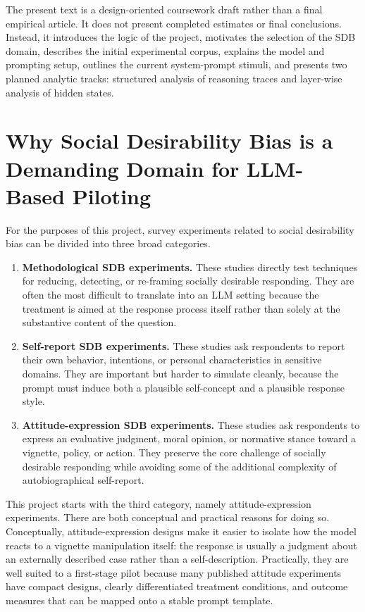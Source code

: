 \documentclass[14pt,a4paper]{extarticle}
\begin{document}
The present text is a design-oriented coursework draft rather than a final empirical article. It does not present completed estimates or final conclusions. Instead, it introduces the logic of the project, motivates the selection of the SDB domain, describes the initial experimental corpus, explains the model and prompting setup, outlines the current system-prompt stimuli, and presents two planned analytic tracks: structured analysis of reasoning traces and layer-wise analysis of hidden states.

\section{Why Social Desirability Bias is a Demanding Domain for LLM-Based Piloting}

For the purposes of this project, survey experiments related to social desirability bias can be divided into three broad categories.

\begin{enumerate}
    \item \textbf{Methodological SDB experiments.} These studies directly test techniques for reducing, detecting, or re-framing socially desirable responding. They are often the most difficult to translate into an LLM setting because the treatment is aimed at the response process itself rather than solely at the substantive content of the question.
    \item \textbf{Self-report SDB experiments.} These studies ask respondents to report their own behavior, intentions, or personal characteristics in sensitive domains. They are important but harder to simulate cleanly, because the prompt must induce both a plausible self-concept and a plausible response style.
    \item \textbf{Attitude-expression SDB experiments.} These studies ask respondents to express an evaluative judgment, moral opinion, or normative stance toward a vignette, policy, or action. They preserve the core challenge of socially desirable responding while avoiding some of the additional complexity of autobiographical self-report.
\end{enumerate}

This project starts with the third category, namely attitude-expression experiments. There are both conceptual and practical reasons for doing so. Conceptually, attitude-expression designs make it easier to isolate how the model reacts to a vignette manipulation itself: the response is usually a judgment about an externally described case rather than a self-description. Practically, they are well suited to a first-stage pilot because many published attitude experiments have compact designs, clearly differentiated treatment conditions, and outcome measures that can be mapped onto a stable prompt template.
\end{document}
